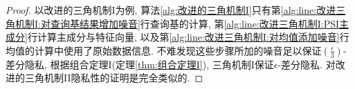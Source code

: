 \begin{proof}
  以改进的三角机制I为例, 算法\ref{alg:改进的三角机制I}只有第\ref{alg:line:改进三角机制I:对查询基结果增加噪音}行查询基的计算, 第\ref{alg:line:改进三角机制I:PSI主成分}行计算主成分与特征向量, 以及第\ref{alg:line:改进三角机制I:对均值添加噪音}行均值的计算中使用了原始数据信息. 不难发现这些步骤所加的噪音足以保证$\left(\frac{\epsilon}{3}\right)$-差分隐私, 根据组合定理I(定理\ref{thm:组合定理I}), 三角机制I保证$\epsilon$-差分隐私. 对改进的三角机制II隐私性的证明是完全类似的.
\end{proof}
